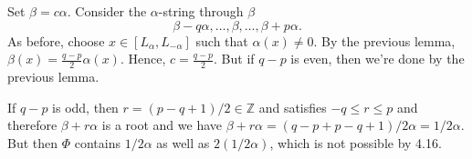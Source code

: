 Set $\beta = c\alpha$. Consider the $\alpha$-string through $\beta$
\[ \beta - q\alpha, \ldots, \beta, \ldots, \beta + p\alpha. \]
As before, choose $x \in [L_\alpha, L_{-\alpha}]$ such that
$\alpha(x)\neq 0$. By the previous lemma,
$\beta(x) = \frac{q-p}{2}\alpha(x)$. Hence, $c = \frac{q-p}{2}$.
But if $q - p$ is even, then we're done by the previous lemma.

If $q - p$ is odd, then $r = (p-q+1)/2 \in \mathbb{Z}$ and satisfies
$-q\leq r\leq p$ and therefore $\beta + r\alpha$ is a root and we have
$\beta+r\alpha = (q-p+p-q+1)/2 \alpha = 1/2 \alpha$. But then
$\Phi$ contains $1/2 \alpha$ as well as $2(1/2 \alpha)$, which is not possible
by 4.16.
